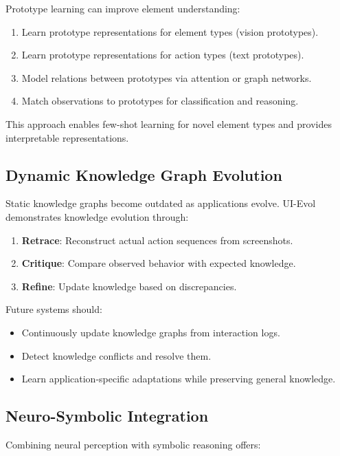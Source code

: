 \documentclass[11pt]{article}
\begin{document}
Prototype learning can improve element understanding:

\begin{enumerate}
    \item Learn prototype representations for element types (vision prototypes).
    \item Learn prototype representations for action types (text prototypes).
    \item Model relations between prototypes via attention or graph networks.
    \item Match observations to prototypes for classification and reasoning.
\end{enumerate}

This approach enables few-shot learning for novel element types and provides interpretable representations.

\subsection{Dynamic Knowledge Graph Evolution}

Static knowledge graphs become outdated as applications evolve. UI-Evol~\cite{uievol2024} demonstrates knowledge evolution through:

\begin{enumerate}
    \item \textbf{Retrace}: Reconstruct actual action sequences from screenshots.
    \item \textbf{Critique}: Compare observed behavior with expected knowledge.
    \item \textbf{Refine}: Update knowledge based on discrepancies.
\end{enumerate}

Future systems should:

\begin{itemize}
    \item Continuously update knowledge graphs from interaction logs.
    \item Detect knowledge conflicts and resolve them.
    \item Learn application-specific adaptations while preserving general knowledge.
\end{itemize}

\subsection{Neuro-Symbolic Integration}

Combining neural perception with symbolic reasoning offers:
\end{document}
